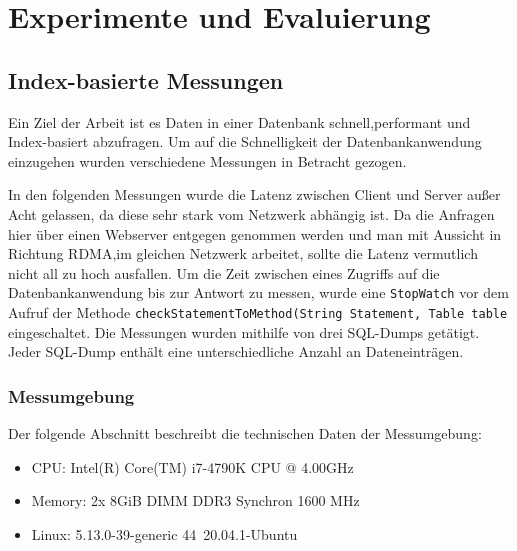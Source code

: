 \chapter{Experimente und Evaluierung}
\label{Evaluierung}
\section{Index-basierte Messungen}

Ein Ziel der Arbeit ist es Daten in einer Datenbank schnell,performant und Index-basiert abzufragen.
Um auf die Schnelligkeit der Datenbankanwendung einzugehen wurden verschiedene Messungen in Betracht gezogen.

In den folgenden Messungen wurde die Latenz zwischen Client und Server außer Acht gelassen, da diese sehr stark vom Netzwerk abhängig ist. Da die Anfragen hier über einen Webserver entgegen genommen werden und man mit Aussicht in Richtung RDMA,im gleichen Netzwerk arbeitet, sollte die Latenz vermutlich nicht all zu hoch ausfallen.
Um die Zeit zwischen eines Zugriffs auf die Datenbankanwendung bis zur Antwort zu messen, wurde eine \texttt{StopWatch} vor dem Aufruf der Methode \texttt{checkStatementToMethod(String Statement, Table table} eingeschaltet.
Die Messungen wurden mithilfe von drei SQL-Dumps getätigt. Jeder SQL-Dump enthält eine unterschiedliche Anzahl an Dateneinträgen.

\subsection{Messumgebung}
Der folgende Abschnitt beschreibt die technischen Daten der Messumgebung:

\begin{itemize}
 \item CPU: Intel(R) Core(TM) i7-4790K CPU @ 4.00GHz
 \item Memory: 2x 8GiB DIMM DDR3 Synchron 1600 MHz
 \item Linux: 5.13.0-39-generic 44~20.04.1-Ubuntu
\end{itemize}




